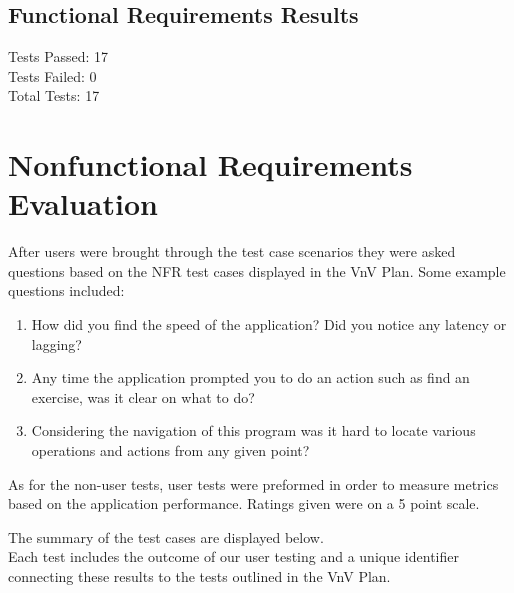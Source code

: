 \documentclass[12pt, titlepage]{article}
\begin{document}
\subsection{Functional Requirements Results}

Tests Passed: 17\\
Tests Failed: 0\\
Total Tests: 17\\

\section{Nonfunctional Requirements Evaluation}

\noindent After users were brought through the test case scenarios they were asked questions based on the NFR test cases displayed in the VnV Plan.
Some example questions included: \\
\begin{enumerate}
	\item How did you find the speed of the application? Did you notice any latency or lagging?
	\item Any time the application prompted you to do an action such as find an exercise, was it clear on what to do?
	\item Considering the navigation of this program was it hard to locate various operations and actions from any given point?
\end{enumerate}

\noindent As for the non-user tests, user tests were preformed in order to measure metrics based on the application performance.
Ratings given were on a 5 point scale.

\noindent The summary of the test cases are displayed below.\\
Each test includes the outcome of our user testing and a unique identifier connecting these results to the tests outlined in the VnV Plan.\\
\end{document}
